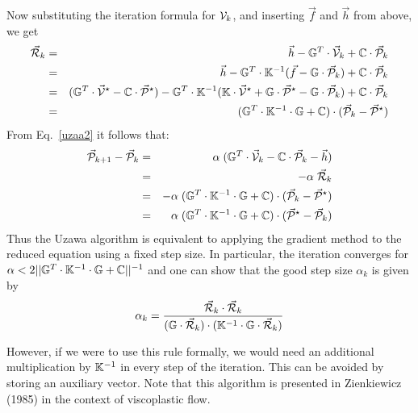 Now substituting the iteration formula for ${\cal V}_k$, and inserting $\vec{f}$ and $\vec{h}$ from above,
we get
\begin{eqnarray}
\vec{\cal R}_k 
&=& \vec{h} -{\mathbb{G}}^T  \cdot \vec{\cal V}_k  +{\mathbb{C}} \cdot \vec{\cal P}_{k} \nonumber\\
&=& \vec{h} -\mathbb{G}^T\cdot \mathbb{K}^{-1} (\vec f - \mathbb{G}\cdot \vec{\cal P}_{k})  +{\mathbb{C}} \cdot \vec{\cal P}_{k}\\
&=& ({\mathbb{G}}^T\cdot\vec{\cal V}^\star - {\mathbb{C}} \cdot \vec{\cal P}^\star) -\mathbb{G}^T\cdot \mathbb{K}^{-1} ({\mathbb{K}}\cdot\vec{\cal V}^\star 
+ {\mathbb{G}}\cdot\vec{\cal P}^\star - {{\mathbb{G}}}\cdot \vec{\cal P}_{k})+{\mathbb{C}} \cdot \vec{\cal P}_{k} \\
&=& ({{\mathbb{G}}}^T \cdot \mathbb{K}^{-1} \cdot \mathbb{G} + {\mathbb{C}})\cdot (\vec {\cal P}_{k} - \vec{\cal P}^\star) 
\end{eqnarray}
From Eq.~\eqref{uzaa2} it follows that:
\begin{eqnarray}
\vec{\cal P}_{k+1} - \vec{\cal P}_{k}  
&=& \alpha\; (\mathbb{G}^T\cdot \vec{\cal V}_k -{\mathbb{C}} \cdot \vec{\cal P}_{k} -\vec h) \\
&=& -\alpha\; \vec{\cal R}_k \\ 
&=& -\alpha\; ( \mathbb{G}^T \cdot \mathbb{K}^{-1} \cdot \mathbb{G} + {\mathbb{C}} )
\cdot (\vec {\cal P}_{k} -\vec{\cal P}^\star)\\ 
&=& \alpha\; (\mathbb{G}^T \cdot \mathbb{K}^{-1} \cdot \mathbb{G} + {\mathbb{C}}) \cdot 
(\vec{\cal P}^\star - \vec {\cal P}_{k} ) 
\end{eqnarray}
Thus the Uzawa algorithm is equivalent to applying the gradient method 
to the reduced equation using a fixed step size. 
In particular, the iteration converges for
$
\alpha < 2 || {\mathbb{G}}^T \cdot {\mathbb{K}}^{-1} \cdot {\mathbb{G}} + {\mathbb{C}}||^{-1}
$
and one can show that the good step size $\alpha_k$ is given by 
\begin{equation}
\alpha_k = \frac{\vec{\cal R}_k \cdot \vec{\cal R}_k}
{({\mathbb{G}} \cdot \vec{\cal R}_k)\cdot ({\mathbb{K}}^{-1}\cdot {\mathbb{G}} \cdot \vec{\cal R}_k)}
\label{uzaa3}
\end{equation}


However, if we were to use this rule formally, we would 
need an additional multiplication by ${\mathbb{K}}^{-1}$ in every step 
of the iteration. This can be avoided by storing an 
auxiliary vector. 
Note that this algorithm is presented in Zienkiewicz \etal (1985) \cite{zivt85} 
in the context of viscoplastic flow.


